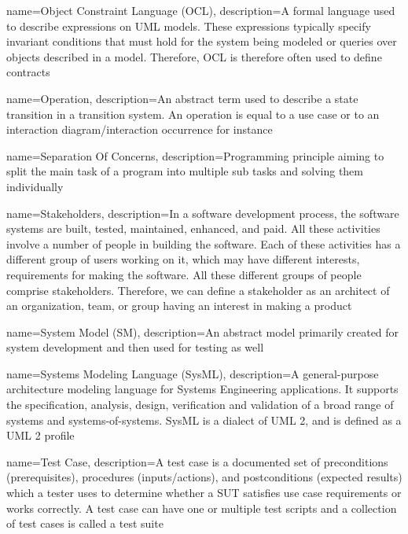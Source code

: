 {
	name={Object Constraint Language (OCL)},
	description={A formal language used to describe expressions on UML models. These expressions typically specify invariant conditions that must hold for the system being modeled or queries over objects described in a model. Therefore, OCL is therefore often used to define contracts \cite{OCL}}
}

{
	name={Operation},
	description={An abstract term used to describe a state transition in a transition system. An operation is equal to a use case or to an interaction diagram/interaction occurrence for instance \cite{ClementineNebut2006, NajlaRaza2007}}
}

{
	name={Separation Of Concerns},
	description={Programming principle aiming to split the main task of a program into multiple sub tasks and solving them individually \cite{Metsa}}
}

{
	name={Stakeholders},
	description={In a software development process, the software systems are built, tested, maintained, enhanced, and paid. All these activities involve a number of people in building the software. Each of these activities has a different group of users working on it, which may have different interests, requirements for making the software. All these different groups of people comprise stakeholders. Therefore, we can define a stakeholder as an architect of an organization, team, or group having an interest in making a product \cite{Stakeholders}}
}

{
	name={System Model (SM)},
	description={An abstract model primarily created for system development and then used for testing as well \cite{Paper1}}
}

{
	name={Systems Modeling Language (SysML)},
	description={A general-purpose architecture modeling language for Systems Engineering applications. It supports the specification, analysis, design, verification and validation of a broad range of systems and systems-of-systems. SysML is a dialect of UML 2, and is defined as a UML 2 profile \cite{SysML}}
}

{
	name={Test Case},
	description={A test case is a documented set of preconditions (prerequisites), procedures (inputs/actions), and postconditions (expected results) which a tester uses to determine whether a SUT satisfies use case requirements or works correctly. A test case can have one or multiple test scripts and a collection of test cases is called a test suite \cite{STFTestCase}}
}

